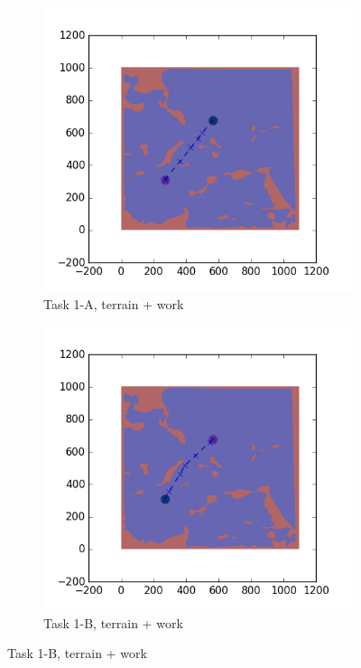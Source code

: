 \documentclass{tamuccthesis}
\begin{document}
\begin{figure}
    \begin{subfigure}[b]{0.4\textwidth}
        \centering
        \includegraphics[width=\textwidth,trim={3cm 3cm 3cm 3cm},clip]{EXP3RG_PathAa_-1_-1_-1_0.png}
        \caption[]{{\small Task 1-A, terrain + work}}    
        \label{fig:Path_1-A_terrain_work}
    \end{subfigure}
    \hfill
    \begin{subfigure}[b]{0.4\textwidth}  
        \centering 
        \includegraphics[width=\textwidth,trim={3cm 3cm 3cm 3cm},clip]{EXP3RG_PathAb_-1_-1_-1_0.png}
        \caption[]{{\small Task 1-B, terrain + work}}   
        \label{fig:Path_1-B_terrain_work}
    \end{subfigure}


\end{figure}
\end{document}
